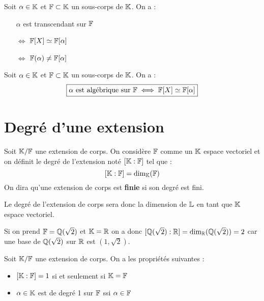 \begin{theorem}
    Soit $\alpha \in \mathbb{K}$ et $\mathbb{F} \subset \mathbb{K}$ un sous-corps de $\mathbb{K}$. On a :
    \begin{itemize}
        \item[] $\alpha$ est transcendant sur $\mathbb{F}$
        \item[$\iff$] $\mathbb{F}[X] \simeq \mathbb{F}[\alpha]$ 
        \item[$\iff$] $ \mathbb{F}(\alpha) \not = \mathbb{F}[\alpha]$   
    \end{itemize}
\end{theorem}

\begin{theorem}
    Soit $\alpha \in \mathbb{K}$ et $\mathbb{F} \subset \mathbb{K}$ un sous-corps de $\mathbb{K}$. On a :
    \[ \boxed{ \alpha \text{ est algébrique sur } \mathbb{F} \iff \mathbb{F}[X] \simeq \mathbb{F}[\alpha] } \] 
\end{theorem}



\section{Degré d'une extension}

\begin{definition}[Degré]
    Soit $ \mathbb{K} / \mathbb{F}$ une extension de corps. On considère $\mathbb{F}$ comme un $\mathbb{K}$ espace vectoriel et on définit 
    le degré de l'extension noté $ [\mathbb{K} : \mathbb{F}]$ tel que : 
        \[ [\mathbb{K} : \mathbb{F}] = \dim_{\mathbb{K}} (\mathbb{F}) \] 
    On dira qu'une extension de corps est \textbf{finie} si son degré est fini. 
\end{definition}

Le degré de l'extension de corps sera donc la dimension de $\mathbb{L}$ en tant que $\mathbb{K}$ espace vectoriel. 

\begin{example}
    Si on prend $\mathbb{F} = \mathbb{Q}(\sqrt{2})$ et $ \mathbb{K} = \mathbb{R}$ on a donc $ [\mathbb{Q}(\sqrt{2}) : \mathbb{R}] = \dim_{\mathbb{R}} (\mathbb{Q}(\sqrt{2})) = 2 $ 
    car une base de $\mathbb{Q}(\sqrt{2})$ sur $\mathbb{R}$ est $(1, \sqrt{2})$. 
\end{example}

\begin{lemma}
    Soit $\mathbb{K} / \mathbb{F}$ une extension de corps. On a les propriétés suivantes : 
    \begin{itemize}
        \item $ [\mathbb{K} : \mathbb{F}] = 1 $ si et seulement si $ \mathbb{K} = \mathbb{F}$ 
        \item $ \alpha \in \mathbb{K}$ est de degré 1 sur $\mathbb{F}$ ssi $ \alpha \in \mathbb{F}$ 
    \end{itemize}
\end{lemma}

